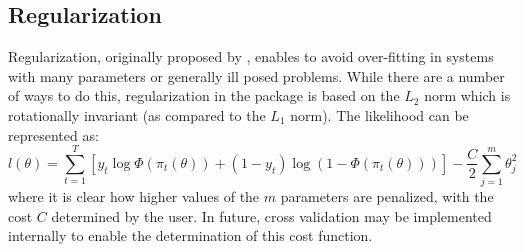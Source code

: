 \subsection{Regularization}
Regularization, originally proposed by \cite{Tikhonov1974}, enables to avoid over-fitting in systems with many parameters or generally ill posed problems. While there are a number of ways to do this, regularization in the \verb@dbm@ package is based on the $L_2$ norm which is rotationally invariant (as compared to the $L_1$ norm). The likelihood can be represented as:
\begin{equation}
l\left( \theta  \right) = \sum\limits_{t = 1}^T {\left[ {{y_t}\log \Phi \left( {{\pi _t}\left( \theta  \right)} \right) + \left( {1 - {y_t}} \right)\log \left( {1 - \Phi \left( {{\pi _t}\left( \theta  \right)} \right)} \right)} \right]}  - \frac{C}{2}\sum\limits_{j = 1}^m {\theta _j^2}
\end{equation}
where it is clear how higher values of the $m$ parameters are penalized, with the cost $C$ determined by the user. In future, cross validation may be implemented internally to enable the determination of this cost function.

